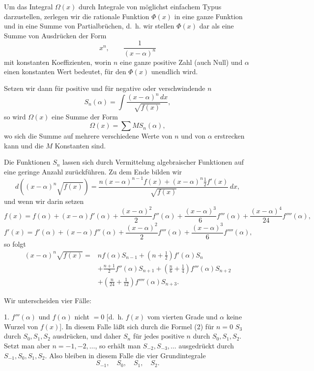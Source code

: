 \documentclass[11pt]{article}
\begin{document}
Um das Integral $\Omega(x)$ durch Integrale von möglichst einfachem Typus darzustellen, zerlegen wir die rationale Funktion $\Phi(x)$ in eine ganze Funktion und in eine Summe von Partialbrüchen, d.~h. wir stellen $\Phi(x)$ dar als eine Summe von Ausdrücken der Form
\[
x^n,\qquad \frac1{(x-\alpha)^n}
\]
mit konstanten Koeffizienten, worin $n$ eine ganze positive Zahl (auch Null) und $\alpha$ einen konstanten Wert bedeutet, für den $\Phi(x)$ unendlich wird.

Setzen wir dann für positive und für negative oder verschwindende $n$
\begin{equation}
S_n(\alpha)=\int\frac{(x-\alpha)^n\,dx}{\sqrt{f(x)}},
\tag{1}
\end{equation}
so wird $\Omega(x)$ eine Summe der Form
\[
\Omega(x)=\sum M S_n(\alpha),
\]
wo sich die Summe auf mehrere verschiedene Werte von $n$ und von $\alpha$ erstrecken kann und die $M$ Konstanten sind.

Die Funktionen $S_n$ lassen sich durch Vermittelung algebraischer Funktionen auf eine geringe Anzahl zurückführen. Zu dem Ende bilden wir
\[
d\!\left((x-\alpha)^n\sqrt{f(x)}\right)
=
\frac{n(x-\alpha)^{n-1}f(x)+(x-\alpha)^n\frac12 f'(x)}
{\sqrt{f(x)}}\,dx,
\]
und wenn wir darin setzen
\[
f(x)=f(\alpha)+(x-\alpha)f'(\alpha)+\frac{(x-\alpha)^2}{2}f''(\alpha)
+\frac{(x-\alpha)^3}{6}f'''(\alpha)
+\frac{(x-\alpha)^4}{24}f''''(\alpha),
\]
\[
f'(x)=f'(\alpha)+(x-\alpha)f''(\alpha)
+\frac{(x-\alpha)^2}{2}f'''(\alpha)
+\frac{(x-\alpha)^3}{6}f''''(\alpha),
\]
so folgt
\begin{equation}
\begin{aligned}
(x-\alpha)^n\sqrt{f(x)}
={}& n f(\alpha)S_{n-1}
+\left(n+\frac12\right)f'(\alpha)S_n\\
&+\frac{n+1}{2}f''(\alpha)S_{n+1}
+\left(\frac n6+\frac14\right)f'''(\alpha)S_{n+2}\\
&+\left(\frac n{24}+\frac1{12}\right)f''''(\alpha)S_{n+3}.
\end{aligned}
\tag{2}
\end{equation}

Wir unterscheiden vier Fälle:

1. $f'''(\alpha)$ und $f(\alpha)$ nicht $=0$ [d.~h. $f(x)$ vom vierten Grade und $\alpha$ keine Wurzel von $f(x)$]. In diesem Falle läßt sich durch die Formel (2) für $n=0$ $S_3$ durch $S_0,S_1,S_2$ ausdrücken, und daher $S_n$ für jedes positive $n$ durch $S_0,S_1,S_2$. Setzt man aber $n=-1,-2,\ldots$, so erhält man $S_{-2},S_{-3},\ldots$ ausgedrückt durch $S_{-1},S_0,S_1,S_2$. Also bleiben in diesem Falle die vier Grundintegrale
\[
S_{-1},\quad S_0,\quad S_1,\quad S_2.
\]
\end{document}
